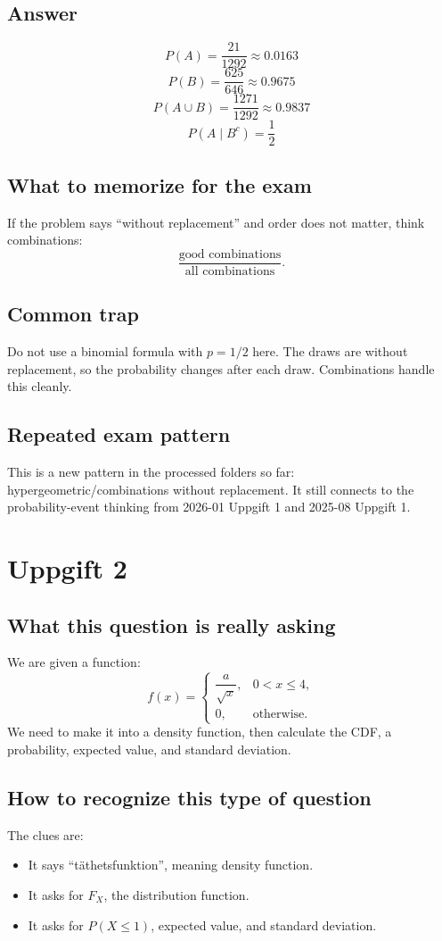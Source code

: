 \documentclass[11pt,a4paper]{article}
\begin{document}
\subsection*{Answer}
\[
\boxed{P(A)=\frac{21}{1292}\approx 0.0163}
\]
\[
\boxed{P(B)=\frac{625}{646}\approx 0.9675}
\]
\[
\boxed{P(A\cup B)=\frac{1271}{1292}\approx 0.9837}
\]
\[
\boxed{P(A\mid B^c)=\frac{1}{2}}
\]

\subsection*{What to memorize for the exam}
If the problem says ``without replacement'' and order does not matter, think combinations:
\[
\frac{\text{good combinations}}{\text{all combinations}}.
\]

\subsection*{Common trap}
Do not use a binomial formula with \(p=1/2\) here. The draws are without replacement, so the probability changes after each draw. Combinations handle this cleanly.

\subsection*{Repeated exam pattern}
This is a new pattern in the processed folders so far: hypergeometric/combinations without replacement. It still connects to the probability-event thinking from 2026-01 Uppgift 1 and 2025-08 Uppgift 1.

\section*{Uppgift 2}

\subsection*{What this question is really asking}
We are given a function:
\[
f(x)=
\begin{cases}
\dfrac{a}{\sqrt{x}}, & 0<x\le 4,\\
0, & \text{otherwise}.
\end{cases}
\]
We need to make it into a density function, then calculate the CDF, a probability, expected value, and standard deviation.

\subsection*{How to recognize this type of question}
The clues are:
\begin{itemize}[leftmargin=*]
    \item It says ``täthetsfunktion'', meaning density function.
    \item It asks for \(F_X\), the distribution function.
    \item It asks for \(P(X\le 1)\), expected value, and standard deviation.
\end{itemize}
\end{document}
